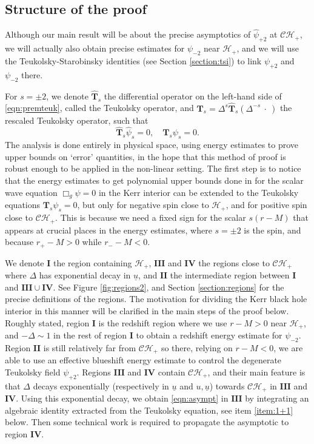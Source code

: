 \documentclass[reqno]{amsart}
\numberwithin{equation}{section}
\newcommand{\teukhat}{\widehat{\teuk}}
\newcommand{\quatre}{\mathbf{IV}}
\newcommand{\mch}{\mathcal{H}}
\newcommand{\app}{‘}
\newcommand{\ubar}{{\underline{u}}}
\newcommand{\ch}{\mathcal{CH_+}}
\newcommand{\teuk}{\mathbf{T}}
\newcommand{\psihat}{\widehat{\psi}}
\newcommand{\un}{\mathbf{I}}
\newcommand{\deux}{\mathbf{II}}
\newcommand{\trois}{\mathbf{III}}
\newcommand{\Psip}{\psi_{+2}}
\newcommand{\psip}{\psi_{+2}}
\newcommand{\Psim}{\psi_{-2}}
\newcommand{\psim}{\psi_{-2}}
\newcommand{\psihatp}{\psihat_{+2}}
\theoremstyle{plain}
\theoremstyle{definition}
\theoremstyle{remark}
\numberwithin{equation}{section}
\begin{document}
\subsection{Structure of the proof}
Although our main result will be about the precise asymptotics of $\psihatp$ at $\ch$, we will actually also obtain precise estimates for $\psim$ near $\mch_+$, and we will use the Teukolsky-Starobinsky identities (see Section \ref{section:tsi}) to link $\psip$ and $\psim$ there. 

For $s=\pm 2$, we denote $\teukhat_s$ the differential operator on the left-hand side of \eqref{eqn:premteuk}, called the Teukolsky operator, and $\teuk_s=\Delta^{s}\teukhat_s(\Delta^{-s}\:\cdot\:)$ the rescaled Teukolsky operator, such that $$\teukhat_s\psihat_s=0,\quad\teuk_s\psi_s=0.$$
The analysis is done entirely in physical space, using energy estimates to prove upper bounds on \app error' quantities, in the hope that this method of proof is robust enough to be applied in the non-linear setting. The first step is to notice that the energy estimates to get polynomial upper bounds done in \cite{scalarMZ} for the scalar wave equation $\Box_g\psi=0$ in the Kerr interior can be extended to the Teukolsky equations $\teuk_s\psi_s=0$, but only for negative spin close to $\mch_+$, and for positive spin close to $\ch$. This is because we need a fixed sign for the scalar $s(r-M)$ that appears at crucial places in the energy estimates, where $s=\pm 2$ is the spin, and because $r_+-M>0$ while $r_--M<0$.

We denote $\un$ the region containing $\mch_+$, $\trois$ and $\quatre$ the regions close to $\ch$ where $\Delta$ has exponential decay in $\ubar$, and $\deux$ the intermediate region between $\un$ and $\trois\cup\quatre$. See Figure \ref{fig:regions2}, and Section \ref{section:regions} for the precise definitions of the regions. {The motivation for dividing the Kerr black hole interior in this manner will be clarified in the main steps of the proof below. Roughly stated, region $\un$ is the redshift region where we use $r-M>0$ near $\mch_+$, and $-\Delta\sim 1$ in the rest of region $\un$ to obtain a redshift energy estimate for $\Psim$. Region $\deux$ is still relatively far from $\ch$ so there, relying on $r-M<0$, we are able to use an effective blueshift energy estimate to control the degenerate Teukolsky field $\Psip$. Regions $\trois$ and $\quatre$ contain $\ch$, and their main feature is that $\Delta$ decays exponentially (respectively in $\ubar$ and $u,\ubar$) towards $\ch$ in $\trois$ and $\quatre$. Using this exponential decay, we obtain \eqref{eqn:asympt} in $\trois$ by integrating an algebraic identity extracted from the Teukolsky equation, see item \eqref{item:1+1} below. Then some technical work is required to propagate the asymptotic to region $\quatre$.}
\end{document}
